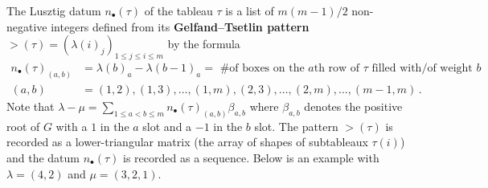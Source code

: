 \documentclass{article} %
\begin{document}
The Lusztig datum $n_\bullet(\tau)$ of the tableau $\tau$ is a list of $ m(m-1)/2$ non-negative integers defined from its \textbf{Gelfand--Tsetlin pattern} $\gt(\tau) = (\lambda(i)_j)_{1\le j\le i\le m}$ by the formula 
$$
\begin{aligned}
n_\bullet(\tau)_{(a,b)} &= \lambda(b)_a - \lambda(b-1)_a = \text{ \# of boxes on the $a$th row of $\tau $ filled with/of weight $b$}  \\
(a,b) &=  (1,2),(1,3),\dots,(1,m),%
(2,3),\dots,(2,m),%
\dots,%
(m-1,m)\,. 
\end{aligned}
$$
Note that $ \lambda - \mu = \displaystyle{\sum_{1 \le a < b \le m}n_\bullet(\tau)_{(a,b)} \beta_{a,b}} $ where $ \beta_{a,b} $ denotes the positive root of $ G$ with a $ 1 $ in the $a $ slot and a $-1$ in the $ b $ slot.
% 
The pattern $\gt(\tau)$ is recorded as a lower-triangular matrix (the array of shapes of subtableaux $\tau(i)$) and the datum $n_\bullet(\tau)$ is recorded as a sequence. Below is an example with $\lambda = (4,2)$ and $\mu = (3,2,1)$.  

\end{document}
